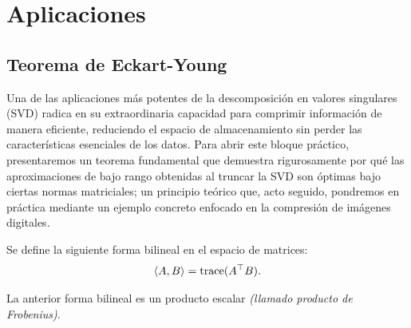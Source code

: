 \chapter{Aplicaciones}
\section{Teorema de Eckart-Young}
Una de las aplicaciones más potentes de la descomposición en valores singulares (SVD) radica en su extraordinaria capacidad para comprimir información de manera eficiente, reduciendo el espacio de almacenamiento sin perder las características esenciales de los datos. Para abrir este bloque práctico, presentaremos un teorema fundamental que demuestra rigurosamente por qué las aproximaciones de bajo rango obtenidas al truncar la SVD son óptimas bajo ciertas normas matriciales; un principio teórico que, acto seguido, pondremos en práctica mediante un ejemplo concreto enfocado en la compresión de imágenes digitales.
\begin{definition}
	Se define la siguiente forma bilineal en el espacio de matrices:
	\[ \langle A, B\rangle = \operatorname{trace}(A^{\top} B). \]
\end{definition}

\begin{proposition}
	La anterior forma bilineal es un producto escalar \textit{(llamado producto de Frobenius)}.
\end{proposition}

